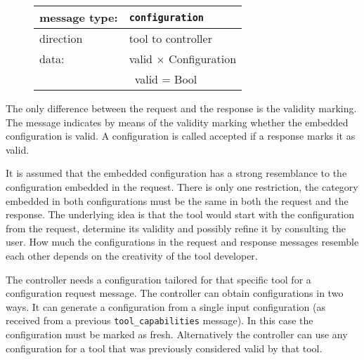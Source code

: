\documentclass{article}
\newcommand{\msg}[1]{\texttt{#1}}
\begin{document}
   \begin{figure}[H]
    \begin{center}
     \begin{tabular}{|ll|}
      \hline
       message type:   & \msg{configuration} \\
      \hline
       direction       & tool to controller \\
       data:           & valid $\times$ Configuration \\
                       & \ valid = Bool \\
      \hline
     \end{tabular}
    \end{center}
   \end{figure}

   \noindent The only difference between the request and the response is
   the validity marking. The message indicates by means of the validity marking
   whether the embedded configuration is valid. A configuration is called
   accepted if a response marks it as valid.

   It is assumed that the embedded configuration has a strong resemblance to
   the configuration embedded in the request. There is only one restriction,
   the category embedded in both configurations must be the same in both the
   request and the response. The underlying idea is that the tool would start
   with the configuration from the request, determine its validity and possibly
   refine it by consulting the user. How much the configurations in the request
   and response messages resemble each other depends on the creativity of the
   tool developer.

   The controller needs a configuration tailored for that specific tool for a
   configuration request message.  The controller can obtain configurations in
   two ways.  It can generate a configuration from a single input configuration
   (as received from a previous \msg{tool\_capabilities} message). In this case
   the configuration must be marked as fresh. Alternatively the controller can
   use any configuration for a tool that was previously considered valid by
   that tool.

\end{document}
